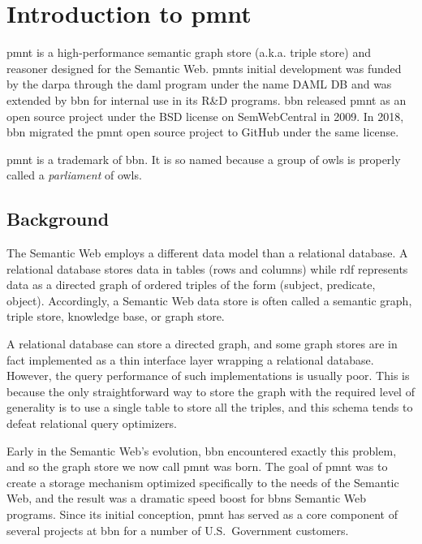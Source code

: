 
\chapter{Introduction to \acl{pmnt}}

\acl{pmnt} is a high-performance semantic graph store (a.k.a. triple store) and reasoner designed for the Semantic Web.  \acp{pmnt} initial development was funded by the \ac{darpa} through the \ac{daml} program under the name DAML DB and was extended by \ac{bbn} for internal use in its R\&D programs.  \ac{bbn} released \ac{pmnt} as an open source project under the BSD license on SemWebCentral in 2009.  In 2018, \ac{bbn} migrated the \ac{pmnt} open source project to GitHub under the same license.

\acl{pmnt} is a trademark of \acl{bbn}.  It is so named because a group of owls is properly called a \emph{parliament} of owls.

\section{Background}

The Semantic Web employs a different data model than a relational database.  A relational database stores data in tables (rows and columns) while \ac{rdf} represents data as a directed graph of ordered triples of the form (subject, predicate, object).  Accordingly, a Semantic Web data store is often called a semantic graph, triple store, knowledge base, or graph store.

A relational database can store a directed graph, and some graph stores are in fact implemented as a thin interface layer wrapping a relational database.  However, the query performance of such implementations is usually poor.  This is because the only straightforward way to store the graph with the required level of generality is to use a single table to store all the triples, and this schema tends to defeat relational query optimizers.

Early in the Semantic Web's evolution, \ac{bbn} encountered exactly this problem, and so the graph store we now call \ac{pmnt} was born.  The goal of \ac{pmnt} was to create a storage mechanism optimized specifically to the needs of the Semantic Web, and the result was a dramatic speed boost for \acp{bbn} Semantic Web programs.  Since its initial conception, \ac{pmnt} has served as a core component of several projects at \ac{bbn} for a number of U.S.\ Government customers.


